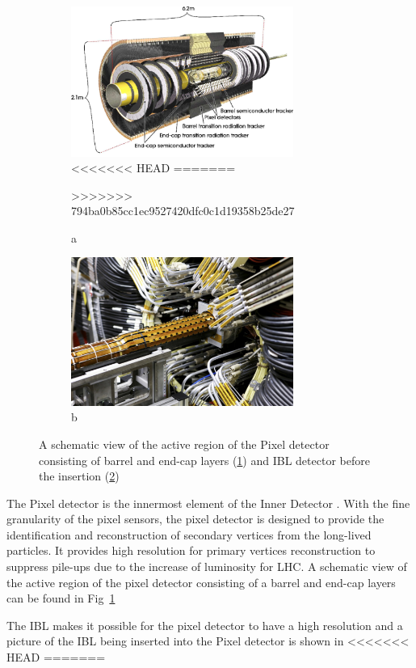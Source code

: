 \begin{figure}[htbp!]
\begin{subfigure}{.5\textwidth}
 \centering
 \includegraphics[width=0.8\textwidth]{chapters/c4/figures/pixel}
<<<<<<< HEAD
=======

>>>>>>> 794ba0b85cc1ec9527420dfc0c1d19358b25de27
 \caption{a}
 \label{fig:pixel1}
\end{subfigure}%
\begin{subfigure}{.5\textwidth}
 \centering
 \includegraphics[width=0.8\textwidth]{chapters/c4/figures/IBL}
 \caption{b}
 \label{fig:pixel2}
\end{subfigure}
 \caption{A schematic view of the active region of the Pixel detector consisting of barrel and end-cap layers (\ref{fig:pixel1}) and IBL detector before the insertion (\ref{fig:pixel2})}
\label{fig:pixel}
\end{figure}
\par The Pixel detector is the innermost element of the Inner Detector \cite{Hirono:2641635}. With the fine granularity of the pixel sensors, 
the pixel detector is designed to provide the identification and reconstruction of secondary vertices from the long-lived particles. It provides high resolution for primary vertices reconstruction to suppress pile-ups due to the increase of luminosity for LHC. A schematic view of the active region of the pixel detector consisting of a barrel and end-cap layers can be found in Fig~\ref{fig:pixel1}
\par The IBL makes it possible for the pixel detector to have a high resolution and a picture of the IBL being inserted into the Pixel detector is shown in 
<<<<<<< HEAD
=======

